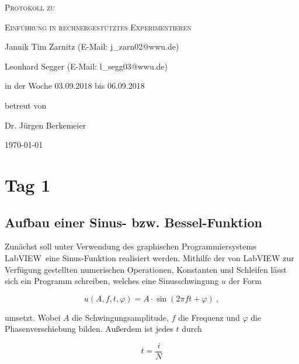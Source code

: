 \documentclass[
a4paper,
12pt,
pagesize,
ngerman
]{scrartcl}
\begin{document}
	
	\begin{titlepage}
		\centering
		{\scshape\LARGE Protokoll zu \par}
		\vspace{1cm}
		{\scshape\huge Einführung in rechnergestütztes Experimentieren \par}
		\vspace{3cm}
		
		{\large Jannik Tim Zarnitz (E-Mail: j\_zarn02@wwu.de) \par}
		{\large Leonhard Segger (E-Mail: l\_segg03@wwu.de) \par}
		\vfill
		
		in der Woche 03.09.2018 bis 06.09.2018\par
		betreut von\par
		{\large Dr. Jürgen Berkemeier}
		
		\vfill
		
		{\large \today\par}
	\end{titlepage}
	\tableofcontents
	\newpage

	\section{Tag 1}
	
	\subsection{Aufbau einer Sinus- bzw. Bessel-Funktion} \label{sinusfkt}
	
	Zunächst soll unter Verwendung des graphischen Programmiersystems \glqq LabVIEW\grqq\ eine Sinus-Funktion realisiert werden. Mithilfe der von LabVIEW zur Verfügung gestellten numerischen Operationen, Konstanten und Schleifen lässt sich ein Programm schreiben, welches eine Sinusschwingung $u$ der Form
	
	\begin{equation} \label{u}
	u(A,f,t,\varphi) = A \cdot \sin(2\pi f t + \varphi) \ ,
	\end{equation}
	
	\noindent umsetzt. Wobei $A$ die Schwingungsamplitude, $f$ die Frequenz und $\varphi$ die Phasenverschiebung bilden. Außerdem ist jedes $t$ durch 
	
	\begin{equation} \label{t}
	t = \frac{i}{N}
	\end{equation}
	
\end{document}
